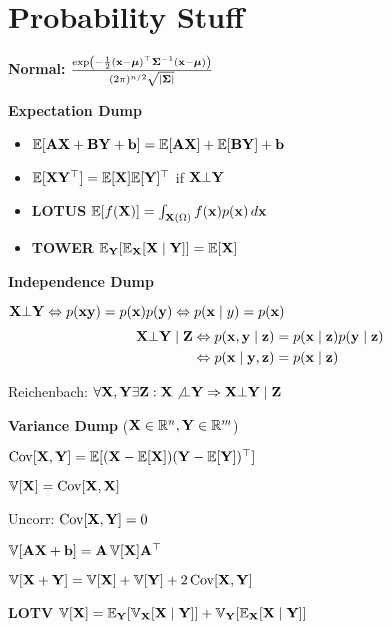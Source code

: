 \section{Probability Stuff}

\begin{center}
    \textbf{Normal:} \(\frac{\exp\left(-\frac{1}{2}(\x - \m)^\top \S^{-1}(\x - \m)\right)}{(2 \pi)^{n/2} \sqrt{\vert\S\vert}}\)
\end{center}

\begin{colored}
    \textbf{Expectation Dump}

    \begin{itemize}
        \item \(\E[\vb{A}\X + \vb{B}\Y + \vb{b}] = \E[\vb{A}\X] + \E[\vb{B}\Y] + \vb{b}\)
        \item \(\E[\X\Y^\top] = \E[\X] \E[\Y]^\top\) if \(\X \bot \Y\)
        \item \textbf{LOTUS} \(\E[f(\X)] = \int_{\X(\Omega)} f(\x)p(\x)\,d\x\)
        \item \textbf{TOWER} \(\E_{\Y} [\E_{\X}[\X \mid \Y]] = \E[\X]\)
    \end{itemize}
\end{colored}

\begin{colored}
    \textbf{Independence Dump}
    
    \(\X\bot\Y \iff p(\x\y) = p(\x)p(\y) \iff p(\x \mid y) = p(\x) \)
    \begin{align*}
    \X\bot\Y\mid\Z &\iff p(\x, \y \mid \z) = p(\x\mid\z) p(\y \mid \z) \\
    &\iff p(\x \mid \y, \z) = p(\x \mid \z)
    \end{align*}

    Reichenbach: \(\forall\X, \Y \exists \Z: \X \not\bot \Y \implies \X \bot \Y \mid \Z\)
\end{colored}

\begin{colored}
    \textbf{Variance Dump} (\(\X \in \R^n, \Y \in \R^m\))

    \begin{itemize*}
        \item \(\Cov[\X, \Y] = \E[(\X - \E[\X])(\Y - \E[\Y])^\top]\) \\
        \item \(\Var[\X] = \Cov[\X, \X]\)
        \item Uncorr: \( \Cov[\X, \Y] = 0\)
        \item \(\Var[\vb{A}\X + \vb{b}] = \vb{A}\Var[\X]\vb{A}^\top\) \\
        \item \(\Var[\X + \Y] = \Var[\X] + \Var[\Y] + 2 \Cov[\X, \Y]\) \\
        \item \textbf{LOTV} \(\Var[\X] = \E_{\Y}[\Var_{\X}[\X \mid \Y]] + \Var_{\Y}[\E_{\X}[\X \mid \Y]]\)
    \end{itemize*}
\end{colored}

